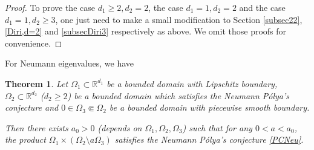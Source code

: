 \documentclass[11pt,letterpaper]{amsart}
\numberwithin{equation}{section}
\theoremstyle{plain}
\newtheorem{theorem}{Theorem}[section]
\theoremstyle{plain}
\numberwithin{equation}{section}
\theoremstyle{remark}
\begin{document}
\begin{proof}
	To prove the case $d_1\ge 2, d_2=2$, the case $d_1=1, d_2=2$ and the case $d_1=1, d_2\ge 3$, one just need to make a small modification to Section \ref{subsec22}, \ref{Diri,d=2} and \ref{subsecDiri3} respectively as above. We omit those proofs for convenience.
	\fi
\end{proof}

For Neumann eigenvalues, we have

\begin{theorem}\label{speNeu}
	Let $\Omega_1\subset \mathbb R^{d_1}$ be a bounded domain with Lipschitz boundary, $\Omega_2\subset \mathbb R^{d_2}$ ($d_2 \ge 2$) be a bounded domain which satisfies the Neumann P\'olya's conjecture and $0 \in \Omega_3\Subset \Omega_2$ be a bounded domain with piecewise smooth boundary.

	Then there exists $a_0>0$ (depends on $\Omega_1,\Omega_2,\Omega_3$) such that for any $0<a<a_0$, the product $\Omega_1\times (\Omega_2\setminus a\Omega_3)$ satisfies the Neumann P\'olya's conjecture \eqref{PCNeu}.
\end{theorem}
\end{document}
